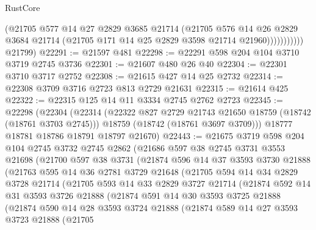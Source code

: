 \begin{lexlean}{RustCore}
\begin{coremodule}
                      (@21705
                        @577
                        @14
                        @27
                        @2829
                        @3685
                        @21714
                        (@21705
                          @576
                          @14
                          @26
                          @2829
                          @3684
                          @21714
                          (@21705 @171 @14 @25 @2829 @3598 @21714 @21960)))))))))))
      @21799)
@22291 := @21597 @481
@22298 := @22291 @598 @204 @104 @3710 @3719 @2745 @3736
@22301 := @21607 @480 @26 @40
@22304 := @22301 @3710 @3717 @2752
@22308 := @21615 @427 @14 @25 @2732
@22314 := @22308 @3709 @3716 @2723 @813 @2729 @21631
@22315 := @21614 @425
@22322 := @22315 @125 @14 @11 @3334 @2745 @2762 @2723
@22345 := @22298
    (@22304
      (@22314
        (@22322 @827 @2729 @21743 @21650 @18759 (@18742 (@18761 @3703 @2745)))
        @18759
        (@18742 (@18761 @3697 @3709)))
      @18777
      @18781
      @18786
      @18791
      @18797
      @21670)
@22443 := @21675
    @3719
    @598
    @204
    @104
    @2745
    @3732
    @2745
    @2862
    (@21686
      @597
      @38
      @2745
      @3731
      @3553
      @21698
      (@21700
        @597
        @38
        @3731
        (@21874
          @596
          @14
          @37
          @3593
          @3730
          @21888
          (@21763
            @595
            @14
            @36
            @2781
            @3729
            @21648
            (@21705
              @594
              @14
              @34
              @2829
              @3728
              @21714
              (@21705
                @593
                @14
                @33
                @2829
                @3727
                @21714
                (@21874
                  @592
                  @14
                  @31
                  @3593
                  @3726
                  @21888
                  (@21874
                    @591
                    @14
                    @30
                    @3593
                    @3725
                    @21888
                    (@21874
                      @590
                      @14
                      @28
                      @3593
                      @3724
                      @21888
                      (@21874
                        @589
                        @14
                        @27
                        @3593
                        @3723
                        @21888
                        (@21705

\end{coremodule}
\end{lexlean}

